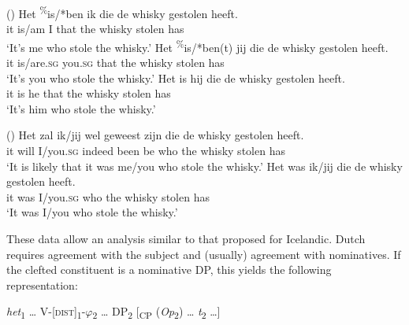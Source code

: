\documentclass[output=paper]{langsci/langscibook}
\begin{document}
\ea (\label{bkm:Ref295486091})  
\ea \gll Het \textsuperscript{\%}is/*ben ik die  de  whisky gestolen heeft.\\
    it       is/am    I  that the whisky stolen      has\\
\glt    ‘It’s me who stole the whisky.’
\ex 
\gll Het \textsuperscript{\%}is/*ben(t) jij         die  de  whisky gestolen heeft.\\
    it      is/are.\textsc{sg}   you.\textsc{sg} that the whisky stolen      has\\
\glt    ‘It’s you who stole the whisky.’
\ex 
\gll Het is hij die  de  whisky gestolen heeft.\\
    it     is he that the whisky stolen     has\\
\glt  ‘It’s him who stole the whisky.’
\z
\z


\ea (\label{bkm:Ref295486338})  
\ea \gll Het zal  ik/jij      wel      geweest zijn die  de  whisky gestolen heeft.\\
    it    will I/you.\textsc{sg} indeed been      be   who the whisky stolen     has\\
\glt    ‘It is likely that it was me/you who stole the whisky.’
\ex \gll  Het was ik/jij        die  de  whisky gestolen heeft.\\
    it     was I/you.\textsc{sg} who the whisky stolen      has\\
\glt  ‘It was I/you who stole the whisky.’
\z
\z

These data allow an analysis similar to that proposed for Icelandic. Dutch requires agreement with the subject and (usually) agreement with nominatives. If the clefted constituent is a nominative DP, this yields the following representation: 

\ea 
 \textit{het}\textsubscript{1} … V-[\textsc{dist}]\textsubscript{1}{}-$\varphi $\textsubscript{2} … DP\textsubscript{2} [\textsubscript{CP} (\textit{Op}\textsubscript{2}) … \textit{t}\textsubscript{2} …]
\z
\end{document}
